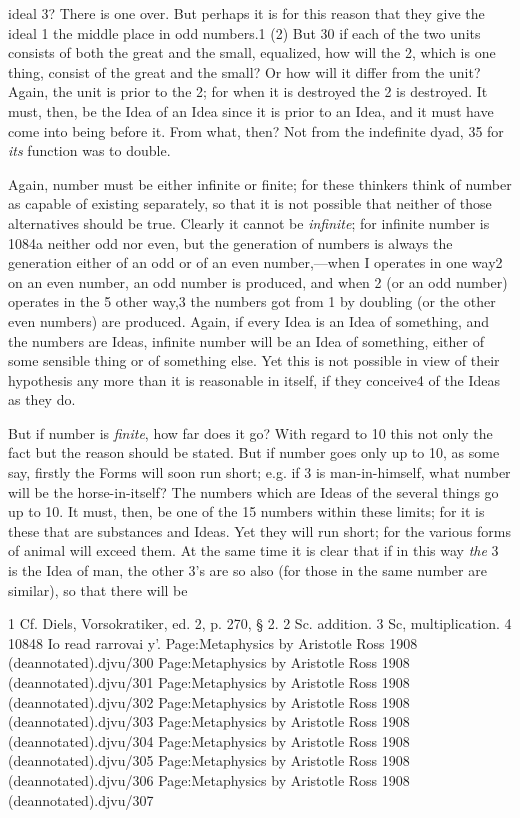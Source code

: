 ideal 3? There is one over. But perhaps it is for this reason that
they give the ideal 1 the middle place in odd numbers.1 (2) But 30
if each of the two units consists of both the great and the
small, equalized, how will the 2, which is one thing, consist of
the great and the small? Or how will it differ from the unit?
Again, the unit is prior to the 2; for when it is destroyed
the 2 is destroyed. It must, then, be the Idea of an Idea
since it is prior to an Idea, and it must have come into being
before it. From what, then? Not from the indefinite dyad, 35
for \emph{its} function was to double.

Again, number must be either infinite or finite; for these
thinkers think of number as capable of existing separately, so
that it is not possible that neither of those alternatives should
be true. Clearly it cannot be \emph{infinite}; for infinite number is 1084a
neither odd nor even, but the generation of numbers is always
the generation either of an odd or of an even number,—when
I operates in one way2 on an even number, an odd number
is produced, and when 2 (or an odd number) operates in the 5
other way,3 the numbers got from 1 by doubling (or the other
even numbers) are produced. Again, if every Idea is an Idea
of something, and the numbers are Ideas, infinite number will
be an Idea of something, either of some sensible thing or of
something else. Yet this is not possible in view of their
hypothesis any more than it is reasonable in itself, if they
conceive4 of the Ideas as they do.

But if number is \emph{finite}, how far does it go? With regard to 10
this not only the fact but the reason should be stated. But if
number goes only up to 10, as some say, firstly the Forms
will soon run short; e.g. if 3 is man-in-himself, what number
will be the horse-in-itself? The numbers which are Ideas of
the several things go up to 10. It must, then, be one of the 15
numbers within these limits; for it is these that are substances
and Ideas. Yet they will run short; for the various forms of
animal will exceed them. At the same time it is clear that if
in this way \emph{the} 3 is the Idea of man, the other 3’s are so also
(for those in the same number are similar), so that there will be

1 Cf. Diels, Vorsokratiker, ed. 2, p. 270, § 2.
2 Sc. addition.
3 Sc, multiplication.
4 10848 Io read rarrovai y’. Page:Metaphysics by Aristotle Ross 1908 (deannotated).djvu/300 Page:Metaphysics by Aristotle Ross 1908 (deannotated).djvu/301 Page:Metaphysics by Aristotle Ross 1908 (deannotated).djvu/302 Page:Metaphysics by Aristotle Ross 1908 (deannotated).djvu/303 Page:Metaphysics by Aristotle Ross 1908 (deannotated).djvu/304 Page:Metaphysics by Aristotle Ross 1908 (deannotated).djvu/305 Page:Metaphysics by Aristotle Ross 1908 (deannotated).djvu/306 Page:Metaphysics by Aristotle Ross 1908 (deannotated).djvu/307

